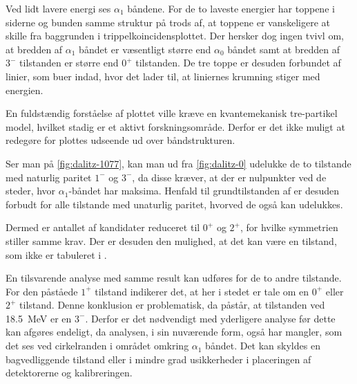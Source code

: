 Ved lidt lavere energi ses $\alpha_{1}$ båndene. For de to laveste energier har toppene i siderne og 
bunden samme struktur på trods af, at toppene er vanskeligere at skille fra baggrunden i
trippelkoincidensplottet. Der hersker dog ingen tvivl om, at bredden af $\alpha_{1}$ båndet er væsentligt
større end $\alpha_{0}$ båndet samt at bredden af $3^{-}$ tilstanden er større end $0^{+}$
tilstanden. De tre toppe er desuden forbundet af linier, som buer indad, hvor det lader til, at
liniernes krumning stiger med energien.

En fuldstændig forståelse af plottet ville kræve en kvantemekanisk tre-partikel model, hvilket
stadig er et aktivt forskningsområde. Derfor er det ikke muligt at redegøre for plottes udseende ud over
båndstrukturen.


Ser man på \cref{fig:dalitz-1077}, kan man ud fra \cref{fig:dalitz-0} udelukke de to tilstande
med naturlig paritet $1^{-}$ og $3^{-}$, da disse kræver, at der er nulpunkter ved de steder, hvor
$\alpha_{1}$-båndet har maksima. Henfald til grundtilstanden af \Be er desuden forbudt for alle
tilstande med unaturlig paritet, hvorved de også kan udelukkes.

Dermed er antallet af kandidater reduceret til $0^{+}$ og $2^{+}$, for hvilke symmetrien stiller
samme krav. Der er desuden den mulighed, at det kan være en tilstand, som ikke er tabuleret i
\cite{Fedorov}. 

En tilsvarende analyse med samme result kan udføres for de to andre tilstande. For den påståede
$1^{+}$ tilstand indikerer det, at her i stedet er tale om en $0^{+}$ eller $2^{+}$ tilstand. Denne
konklusion er problematisk, da \cite{States} påstår, at tilstanden ved \SI{18.5}{\MeV} er en
$3^{-}$.  Derfor er det nødvendigt med yderligere analyse før dette kan afgøres endeligt, da
analysen, i sin nuværende form, også har mangler, som det ses ved cirkelranden i området omkring
$\alpha_{1}$ båndet. Det kan skyldes en bagvedliggende tilstand eller i mindre grad usikkerheder i
placeringen af detektorerne og kalibreringen.















